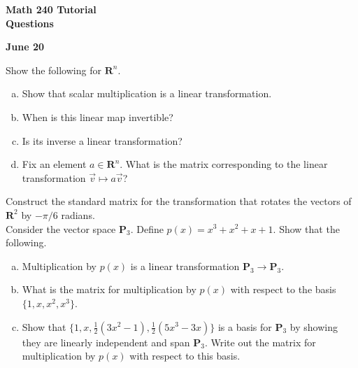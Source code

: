 \documentclass[a4paper,11pt]{article}
\newcommand{\R}{\mathbf{R}}
\newcommand{\PP}{\mathbf{P}}
\begin{document}
\begin{center}
  {\Large\bfseries Math 240 Tutorial \\ Questions}
\end{center}
\begin{center}
  {\bfseries June 20}
\end{center}

 Show the following for $\R^n$.
\begin{enumerate}[(a)]
\item Show that scalar multiplication is a linear transformation.
\item When is this linear map invertible?
\item Is its inverse a linear transformation?
\item Fix an element $a \in \R^n$. What is the matrix corresponding to the
  linear transformation $\vec v \mapsto a\vec v$? \\
\end{enumerate}

 Construct the standard matrix for the
transformation that rotates the vectors of $\R^2$ by $-\pi/6$ radians. \\

 Consider the vector space $\PP_3$. Define $p(x) =
x^3 + x^2 + x + 1$. Show that the following.
\begin{enumerate}[(a)]
\item Multiplication by $p(x)$ is a linear transformation $\PP_3 \rightarrow
  \PP_3$.
\item What is the matrix for multiplication by $p(x)$ with respect to the basis
  $\{1,x,x^2,x^3\}$.
\item Show that $\{1,x,\frac{1}{2}(3x^2-1),\frac{1}{2}(5x^3-3x)\}$ is a basis
  for $\PP_3$ by showing they are linearly independent and span $\PP_3$. Write
  out the matrix for multiplication by $p(x)$ with respect to this basis. \\
\end{enumerate}
\end{document}
